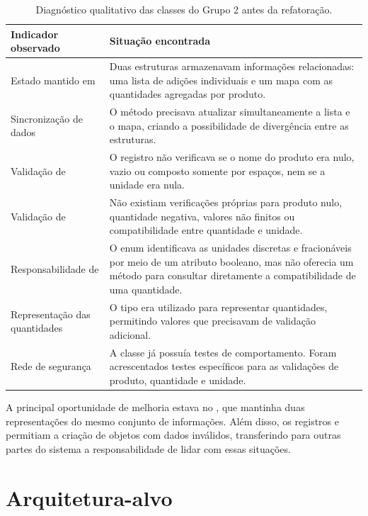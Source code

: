 \begin{table}[H]\centering\small
\begin{tabularx}{\textwidth}{>{\raggedright\arraybackslash}p{5.5cm}Y}
\toprule
\textbf{Indicador observado} & \textbf{Situação encontrada} \\
\midrule
Estado mantido em  & Duas estruturas armazenavam informações relacionadas: uma lista de adições individuais e um mapa com as quantidades agregadas por produto. \\
\addlinespace
Sincronização de dados & O método  precisava atualizar simultaneamente a lista e o mapa, criando a possibilidade de divergência entre as estruturas. \\
\addlinespace
Validação de  & O registro não verificava se o nome do produto era nulo, vazio ou composto somente por espaços, nem se a unidade era nula. \\
\addlinespace
Validação de  & Não existiam verificações próprias para produto nulo, quantidade negativa, valores não finitos ou compatibilidade entre quantidade e unidade. \\
\addlinespace
Responsabilidade de  & O enum identificava as unidades discretas e fracionáveis por meio de um atributo booleano, mas não oferecia um método para consultar diretamente a compatibilidade de uma quantidade. \\
\addlinespace
Representação das quantidades & O tipo  era utilizado para representar quantidades, permitindo valores que precisavam de validação adicional. \\
\addlinespace
Rede de segurança & A classe  já possuía testes de comportamento. Foram acrescentados testes específicos para as validações de produto, quantidade e unidade. \\
\bottomrule
\end{tabularx}
\caption{Diagnóstico qualitativo das classes do Grupo 2 antes da refatoração.}
\end{table}

A principal oportunidade de melhoria estava no , que mantinha duas representações do mesmo conjunto de informações. Além disso, os registros  e  permitiam a criação de objetos com dados inválidos, transferindo para outras partes do sistema a responsabilidade de lidar com essas situações.

\section{Arquitetura-alvo}

